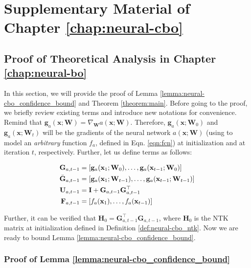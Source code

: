 \chapter{Supplementary Material of Chapter \ref{chap:neural-cbo}} 
\label{section:neural-cbo_supp}

\section{Proof of Theoretical Analysis in Chapter \ref{chap:neural-bo}}
\label{section:neural-cbo_appendix}

In this section, we will provide the proof of Lemma \ref{lemma:neural-cbo_confidence_bound} and Theorem \ref{theorem:main}. Before going to the proof, we briefly review existing terms and introduce new notations for convenience.
Remind that $\mathbf{g}_{a}(\mathbf{x}; \mathbf{W}) = \nabla_{\mathbf{W}}a(\mathbf{x}; \mathbf{W})$. Therefore, $\mathbf{g}_{a}(\mathbf{x}; \mathbf{W}_0)$ and $\mathbf{g}_{a}(\mathbf{x}; \mathbf{W}_t)$ will be the gradients of the neural network $a(\mathbf{x}; \mathbf{W})$ (using to model an \textit{arbitrary} function $f_a$, defined in Eqn. \ref{eqn:fcn}) at initialization and at iteration $t$, respectively.  Further, let us define terms as follows:


\begin{equation*}
\label{def:neural_cbo_linear_kernelized_terms}
    \begin{split}   
\mathbf{G}_{a,t-1} & = [\mathbf{g}_{a}(\mathbf{x}_1; \mathbf{W}_0),\dots, \mathbf{g}_{a}(\mathbf{x}_{t-1}; \mathbf{W}_0)]  
\\
\Bar{\mathbf{G}}_{a,t-1} & = [\mathbf{g}_{a}(\mathbf{x}_1; \mathbf{W}_{t-1}),\dots, \mathbf{g}_{a}(\mathbf{x}_{t-1}; \mathbf{W}_{t-1})] 
\\
\mathbf{U}_{a,t-1} &=  \mathbf{I} + \mathbf{G}_{a,t-1} \mathbf{G}_{a,t-1}^\top 
\\
\mathbf{F}_{a,t-1} &= [f_a(\mathbf{x}_1), \dots, f_a(\mathbf{x}_{t-1})] 
    \end{split}
\end{equation*}

Further, it can be verified that $\mathbf{H}_0 = \mathbf{G}_{a,t-1} ^\top\mathbf{G}_{a,t-1}$, where $\mathbf{H}_0$ is the NTK matrix at initialization defined in Definition \ref{def:neural-cbo_ntk}.  Now we are ready to bound Lemma \ref{lemma:neural-cbo_confidence_bound}.

\subsection{Proof of Lemma \ref{lemma:neural-cbo_confidence_bound}}
\ConfidenceBound*

